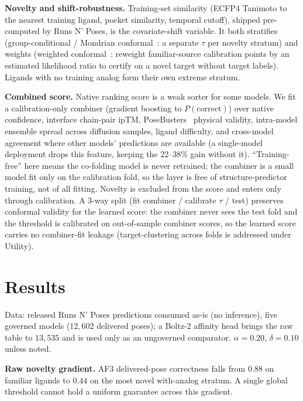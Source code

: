 \documentclass[10pt]{article}
\begin{document}
\textbf{Novelty and shift-robustness.} Training-set similarity (ECFP4 Tanimoto to the nearest training
ligand, pocket similarity, temporal cutoff), shipped pre-computed by Runs N' Poses, is the
covariate-shift variable. It both stratifies (group-conditional / Mondrian conformal~\citep{mondrian}:
a separate $\tau$ per novelty stratum) and weights (weighted conformal~\citep{tibshirani2019}:
reweight familiar-source calibration points by an estimated likelihood ratio to certify on a novel
target without target labels). Ligands with no training analog form their own extreme stratum.

\textbf{Combined score.} Native ranking score is a weak sorter for some models. We fit a
calibration-only combiner (gradient boosting to $P(\text{correct})$) over native confidence, interface
chain-pair ipTM, PoseBusters~\citep{posebusters} physical validity, intra-model ensemble spread across
diffusion samples, ligand difficulty, and cross-model agreement where other models' predictions are
available (a single-model deployment drops this feature, keeping the 22--38\% gain without it).
``Training-free'' here means the co-folding model is never retrained; the combiner is a small model
fit only on the calibration fold, so the layer is free of structure-predictor training, not of all
fitting. Novelty is excluded from the score and enters only through calibration. A 3-way split (fit
combiner / calibrate $\tau$ / test) preserves conformal validity for the learned score: the combiner
never sees the test fold and the threshold is calibrated on out-of-sample combiner scores, so the
learned score carries no combiner-fit leakage (target-clustering across folds is addressed under
Utility).

\section{Results}
Data: released Runs N' Poses predictions consumed as-is (no inference), five governed models
($12{,}602$ delivered poses); a Boltz-2 affinity head brings the raw table to $13{,}535$ and is used
only as an ungoverned comparator. $\alpha=0.20$, $\delta=0.10$ unless noted.

\textbf{Raw novelty gradient.} AF3 delivered-pose correctness falls from $0.88$ on familiar ligands to
$0.44$ on the most novel with-analog stratum. A single global threshold cannot hold a uniform
guarantee across this gradient.
\end{document}
